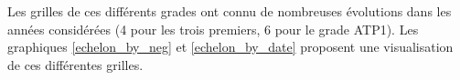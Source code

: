 \documentclass[11pt,a4paper]{article}
\begin{document}
Les grilles de ces différents grades ont connu de nombreuses évolutions dans les années considérées (4 pour les trois premiers, 6 pour le grade ATP1). Les graphiques \ref{echelon_by_neg} et \ref{echelon_by_date} proposent une visualisation de ces différentes grilles. 


%
%
%
%
%
%
%
\end{document}
